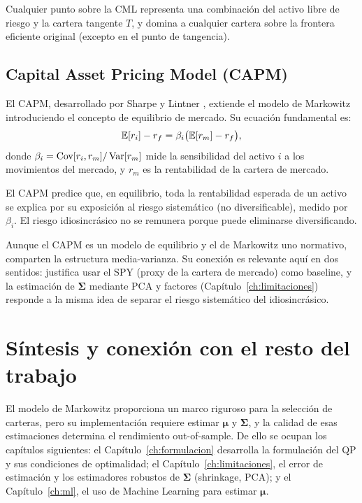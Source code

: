 Cualquier punto sobre la CML representa una combinación del activo libre
de riesgo y la cartera tangente $T$, y domina a cualquier cartera sobre
la frontera eficiente original (excepto en el punto de tangencia).

\subsection{Capital Asset Pricing Model (CAPM)}

El CAPM, desarrollado por Sharpe \cite{Sharpe1964} y Lintner
\cite{Lintner1965}, extiende el modelo de Markowitz introduciendo el
concepto de equilibrio de mercado. Su ecuación fundamental es:
\begin{equation}
    \mathbb{E}[r_i] - r_f = \beta_i \bigl(\mathbb{E}[r_m] - r_f\bigr),
    \label{eq:capm}
\end{equation}
donde $\beta_i = \mathop{\textnormal{Cov}}\nolimits[r_i, r_m] / \mathop{\textnormal{Var}}\nolimits[r_m]$ mide la sensibilidad del
activo $i$ a los movimientos del mercado, y $r_m$ es la rentabilidad
de la cartera de mercado.

El CAPM predice que, en equilibrio, toda la rentabilidad esperada de un
activo se explica por su exposición al riesgo sistemático (no
diversificable), medido por $\beta_i$. El riesgo idiosincrásico no se
remunera porque puede eliminarse diversificando.

Aunque el CAPM es un modelo de equilibrio y el de Markowitz uno normativo,
comparten la estructura media-varianza. Su conexión es relevante aquí en dos
sentidos: justifica usar el SPY (proxy de la cartera de mercado) como baseline,
y la estimación de $\boldsymbol{\Sigma}$ mediante PCA y factores
(Capítulo~\ref{ch:limitaciones}) responde a la misma idea de separar el riesgo
sistemático del idiosincrásico.

\section{Síntesis y conexión con el resto del trabajo}

El modelo de Markowitz proporciona un marco riguroso para la selección de
carteras, pero su implementación requiere estimar $\boldsymbol{\mu}$ y
$\boldsymbol{\Sigma}$, y la calidad de esas estimaciones determina el
rendimiento out-of-sample. De ello se ocupan los capítulos siguientes: el
Capítulo~\ref{ch:formulacion} desarrolla la formulación del QP y sus
condiciones de optimalidad; el Capítulo~\ref{ch:limitaciones}, el error de
estimación y los estimadores robustos de $\boldsymbol{\Sigma}$ (shrinkage,
PCA); y el Capítulo~\ref{ch:ml}, el uso de Machine Learning para estimar
$\boldsymbol{\mu}$.
